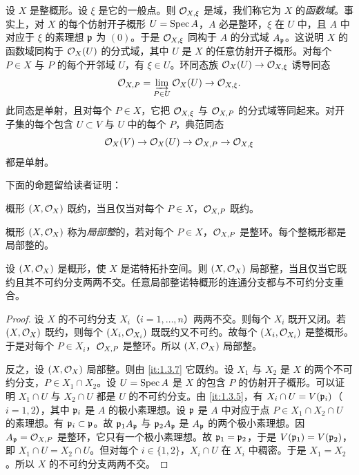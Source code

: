 设 $X$ 是整概形。设 $\xi$ 是它的一般点。则 $\mathcal{O}_{X,\xi}$ 是域，我们称它为 $X$ 的\emph{函数域}。事实上，对 $X$ 的每个仿射开子概形 $U=\operatorname{Spec} A$，$A$ 必是整环，$\xi$ 在 $U$ 中，且 $A$ 中对应于 $\xi$ 的素理想 $\mathfrak{p}$ 为 $(0)$。于是 $\mathcal{O}_{X,\xi}$ 同构于 $A$ 的分式域 $A_{\mathfrak{p}}$。这说明 $X$ 的函数域同构于 $\mathcal{O}_X(U)$ 的分式域，其中 $U$ 是 $X$ 的任意仿射开子概形。对每个 $P\in X$ 与 $P$ 的每个开邻域 $U$，有 $\xi\in U$。环同态族 $\mathcal{O}_X(U)\to \mathcal{O}_{X,\xi}$ 诱导同态
\[
\mathcal{O}_{X,P}=\varinjlim_{P\in U}\mathcal{O}_X(U)\to \mathcal{O}_{X,\xi}.
\]
此同态是单射，且对每个 $P\in X$，它把 $\mathcal{O}_{X,\xi}$ 与 $\mathcal{O}_{X,P}$ 的分式域等同起来。对开子集的每个包含 $U\subset V$ 与 $U$ 中的每个 $P$，典范同态
\[
\mathcal{O}_X(V)\to \mathcal{O}_X(U)\to \mathcal{O}_{X,P}\to \mathcal{O}_{X,\xi}
\]
都是单射。

下面的命题留给读者证明：
\begin{proposition}\label{it:1.3.7}
概形 $(X,\mathcal{O}_X)$ 既约，当且仅当对每个 $P\in X$，$\mathcal{O}_{X,P}$ 既约。
\end{proposition}

概形 $(X,\mathcal{O}_X)$ 称为\emph{局部整}的，若对每个 $P\in X$，$\mathcal{O}_{X,P}$ 是整环。每个整概形都是局部整的。

\begin{proposition}\label{it:1.3.8}
设 $(X,\mathcal{O}_X)$ 是概形，使 $X$ 是诺特拓扑空间。则 $(X,\mathcal{O}_X)$ 局部整，当且仅当它既约且其不可约分支两两不交。任意局部整诺特概形的连通分支都与不可约分支重合。
\end{proposition}

\begin{proof}
设 $X$ 的不可约分支 $X_i$（$i=1,\dots,n$）两两不交。则每个 $X_i$ 既开又闭。若 $(X,\mathcal{O}_X)$ 既约，则每个 $(X_i,\mathcal{O}_{X_i})$ 既既约又不可约。故每个 $(X_i,\mathcal{O}_{X_i})$ 是整概形。于是对每个 $P\in X_i$，$\mathcal{O}_{X,P}$ 是整环。所以 $(X,\mathcal{O}_X)$ 局部整。

反之，设 $(X,\mathcal{O}_X)$ 局部整。则由 \ref{it:1.3.7} 它既约。设 $X_1$ 与 $X_2$ 是 $X$ 的两个不可约分支，$P\in X_1\cap X_2$。设 $U=\operatorname{Spec} A$ 是 $X$ 的包含 $P$ 的仿射开子概形。可以证明 $X_1\cap U$ 与 $X_2\cap U$ 都是 $U$ 的不可约分支。由 \ref{it:1.3.5}，有 $X_i\cap U=V(\mathfrak{p}_i)$（$i=1,2$），其中 $\mathfrak{p}_i$ 是 $A$ 的极小素理想。设 $\mathfrak{p}$ 是 $A$ 中对应于点 $P\in X_1\cap X_2\cap U$ 的素理想。有 $\mathfrak{p}_i\subset \mathfrak{p}$。故 $\mathfrak{p}_1A_{\mathfrak{p}}$ 与 $\mathfrak{p}_2A_{\mathfrak{p}}$ 是 $A_{\mathfrak{p}}$ 的两个极小素理想。因 $A_{\mathfrak{p}}=\mathcal{O}_{X,P}$ 是整环，它只有一个极小素理想。故 $\mathfrak{p}_1=\mathfrak{p}_2$，于是 $V(\mathfrak{p}_1)=V(\mathfrak{p}_2)$，即 $X_1\cap U=X_2\cap U$。但对每个 $i\in\{1,2\}$，$X_i\cap U$ 在 $X_i$ 中稠密。于是 $X_1=X_2$。所以 $X$ 的不可约分支两两不交。
\end{proof}

